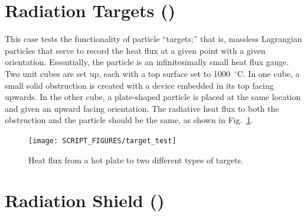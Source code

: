 \documentclass[11pt]{book}
\begin{document}
\section{Radiation Targets (\texorpdfstring{}{target\_test}) }
\label{target_test}

This case tests the functionality of particle ``targets;'' that is, massless Lagrangian particles that serve to record the heat flux at a given point with a given orientation. Essentially, the particle is an infinitesimally small heat flux gauge. Two unit cubes are set up, each with a top surface set to 1000~$^\circ$C. In one cube, a small solid obstruction is created with a device embedded in its top facing upwards. In the other cube, a plate-shaped particle is placed at the same location and given an upward facing orientation. The radiative heat flux to both the obstruction and the particle should be the same, as shown in Fig.~\ref{target_test_plot}.
\begin{figure}[ht]
\centering
\texttt{[image: SCRIPT\_FIGURES/target\_test]}
\caption[The  case]{Heat flux from a hot plate to two different types of targets.}
\label{target_test_plot}
\end{figure}



\section{Radiation Shield (\texorpdfstring{}{radiation\_shield}) }
\label{radiation_shield}
\end{document}
